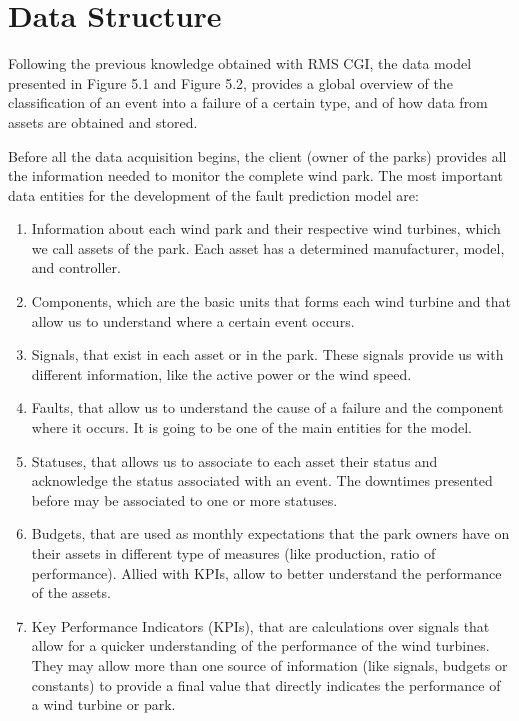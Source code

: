 \section{Data Structure} 
\label{sub:if_you_use_this_template} 

Following the previous knowledge obtained with RMS CGI, the data model presented in Figure 5.1 and Figure 5.2, provides a global overview of the classification of an event into a failure of a certain type, and of how data from assets are obtained and stored.

Before all the data acquisition begins, the client (owner of the parks) provides all the information needed to monitor the complete wind park. The most important data entities for the development of the fault prediction model are:

\begin{enumerate}
    \item 
Information about each wind park and their respective wind turbines, which we call assets of the park. Each asset has a determined manufacturer, model, and controller.
    \item
Components, which are the basic units that forms each wind turbine and that allow us to understand where a certain event occurs.
    \item
Signals, that exist in each asset or in the park. These signals provide us with different information, like the active power or the wind speed.
    \item
Faults, that allow us to understand the cause of a failure and the component where it occurs. It is going to be one of the main entities for the model.
    \item
Statuses, that allows us to associate to each asset their status and acknowledge the status associated with an event. The downtimes presented before may be associated to one or more statuses.
    \item
Budgets, that are used as monthly expectations that the park owners have on their assets in different type of measures (like production, ratio of performance). Allied with KPIs, allow to better understand the performance of the assets.
    \item
Key Performance Indicators (KPIs), that are calculations over signals that allow for a quicker understanding of the performance of the wind turbines. They may allow more than one source of information (like signals, budgets or constants) to provide a final value that directly indicates the performance of a wind turbine or park.
\end{enumerate}

